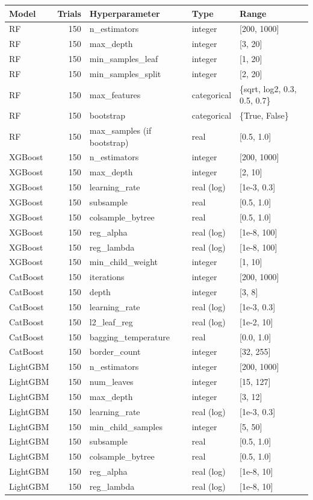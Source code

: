 \begin{tabular}{lrlll}
\toprule
Model & Trials & Hyperparameter & Type & Range \\
\midrule
RF & 150 & n\_estimators & integer & [200, 1000] \\
RF & 150 & max\_depth & integer & [3, 20] \\
RF & 150 & min\_samples\_leaf & integer & [1, 20] \\
RF & 150 & min\_samples\_split & integer & [2, 20] \\
RF & 150 & max\_features & categorical & \{sqrt, log2, 0.3, 0.5, 0.7\} \\
RF & 150 & bootstrap & categorical & \{True, False\} \\
RF & 150 & max\_samples (if bootstrap) & real & [0.5, 1.0] \\
XGBoost & 150 & n\_estimators & integer & [200, 1000] \\
XGBoost & 150 & max\_depth & integer & [2, 10] \\
XGBoost & 150 & learning\_rate & real (log) & [1e-3, 0.3] \\
XGBoost & 150 & subsample & real & [0.5, 1.0] \\
XGBoost & 150 & colsample\_bytree & real & [0.5, 1.0] \\
XGBoost & 150 & reg\_alpha & real (log) & [1e-8, 100] \\
XGBoost & 150 & reg\_lambda & real (log) & [1e-8, 100] \\
XGBoost & 150 & min\_child\_weight & integer & [1, 10] \\
CatBoost & 150 & iterations & integer & [200, 1000] \\
CatBoost & 150 & depth & integer & [3, 8] \\
CatBoost & 150 & learning\_rate & real (log) & [1e-3, 0.3] \\
CatBoost & 150 & l2\_leaf\_reg & real (log) & [1e-2, 10] \\
CatBoost & 150 & bagging\_temperature & real & [0.0, 1.0] \\
CatBoost & 150 & border\_count & integer & [32, 255] \\
LightGBM & 150 & n\_estimators & integer & [200, 1000] \\
LightGBM & 150 & num\_leaves & integer & [15, 127] \\
LightGBM & 150 & max\_depth & integer & [3, 12] \\
LightGBM & 150 & learning\_rate & real (log) & [1e-3, 0.3] \\
LightGBM & 150 & min\_child\_samples & integer & [5, 50] \\
LightGBM & 150 & subsample & real & [0.5, 1.0] \\
LightGBM & 150 & colsample\_bytree & real & [0.5, 1.0] \\
LightGBM & 150 & reg\_alpha & real (log) & [1e-8, 10] \\
LightGBM & 150 & reg\_lambda & real (log) & [1e-8, 10] \\
\bottomrule
\end{tabular}
